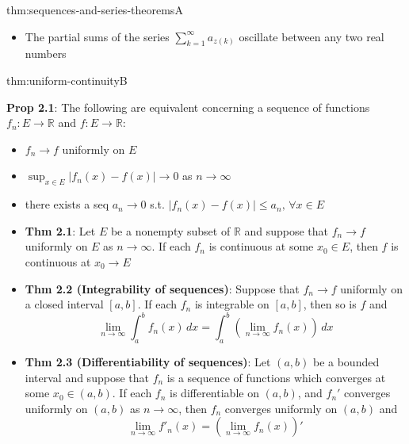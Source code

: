 \documentclass[landscape, 8pt]{extarticle}
\begin{document}
\begin{multicols}{3}
\begin{thm}{thm:sequences-and-series-theorems}{A}
\begin{itemize}[leftmargin=*]
		\item The partial sums of the series $\sum_{k=1}^{\infty} a_{z(k)}$ oscillate between any two real numbers

	\end{itemize}

\end{thm}



\begin{thm}{thm:uniform-continuity}{B}

	\textbf{Prop 2.1}: The following are equivalent concerning a sequence of functions $f_{n}:E\to \mathbb{R}$ and $f: E\to \mathbb{R}$:

		\begin{itemize}
			\setlength\itemsep{0em}
			\item $f_{n}\to f$ uniformly on $E$

			\item $\displaystyle\sup_{x\in E}\lvert f_{n}(x)-f(x) \rvert\to 0$ as $n\to\infty$

			\item there exists a seq $a_{n}\to 0$ s.t. $\lvert f_{n}(x)-f(x) \rvert\le a_{n},\, \forall x\in E$

		\end{itemize}


	\begin{itemize}[leftmargin=*]
	    \setlength\itemsep{0em}
			
		\item \textbf{Thm 2.1}: Let $E$ be a nonempty subset of $\mathbb{R}$ and suppose that $f_{n}\to f$ uniformly on $E$ as $n\to\infty$. If each $f_{n}$ is continuous at some $x_{0}\in E$, then $f$ is continuous at $x_{0}\to E$
		
		\item \textbf{Thm 2.2 (Integrability of sequences)}: Suppose that $f_{n}\to f$ uniformly on a closed interval $[a,b]$. If each $f_{n}$ is integrable on $[a,b]$, then so is $f$ and 
	\[\lim_{n \to \infty} \int_{a}^{b} f_{n}(x) \, dx =\int_{a}^{b} \left(\lim_{n \to \infty} f_{n}(x)\right) \, dx \]
		\item \textbf{Thm 2.3 (Differentiability of sequences)}: Let $(a,b)$ be a bounded interval and suppose that $f_{n}$ is a sequence of functions which converges at some $x_{0}\in(a,b)$. If each $f_{n}$ is differentiable on $(a,b)$, and $f_{n}'$ converges uniformly on $(a,b)$ as $n\to\infty$, then $f_{n}$ converges uniformly on $(a,b)$ and
			\vspace{-2pt}
			\[\lim_{n \to \infty} f'_{n}(x)=\left(\lim_{n \to \infty} f_{n}(x)\right)'\]
	\end{itemize}



\end{thm}
\end{multicols}
\end{document}
